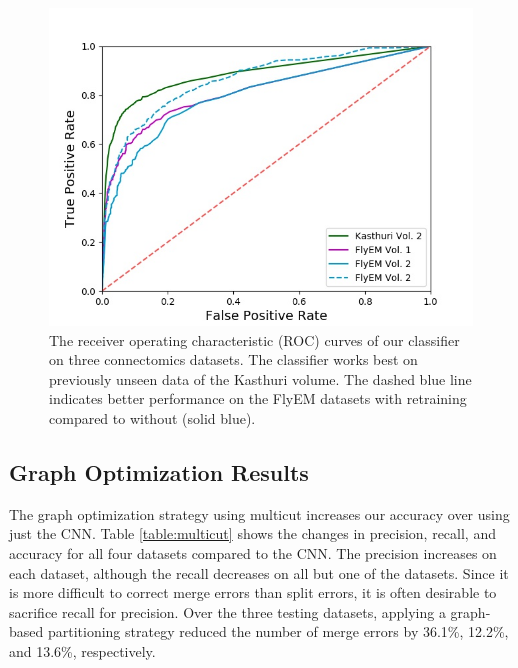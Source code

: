 \begin{figure}
	\centering
	\includegraphics[width=0.95\linewidth]{./figures/receiver-operating-characteristic.jpg}
	\caption{The receiver operating characteristic (ROC) curves of our classifier on three connectomics datasets. The classifier works best on previously unseen data of the Kasthuri volume. The dashed blue line indicates better performance on the FlyEM datasets with retraining compared to without (solid blue).}
	\label{fig:receiver-operating-characteristic}
\end{figure}

\subsection{Graph Optimization Results}

The graph optimization strategy using multicut increases our accuracy over using just the CNN.
Table \ref{table:multicut} shows the changes in precision, recall, and accuracy for all four datasets compared to the CNN.
The precision increases on each dataset, although the recall decreases on all but one of the datasets.
Since it is more difficult to correct merge errors than split errors, it is often desirable to sacrifice recall for precision.
Over the three testing datasets, applying a graph-based partitioning strategy reduced the number of merge errors by 36.1\%, 12.2\%, and 13.6\%, respectively. 

